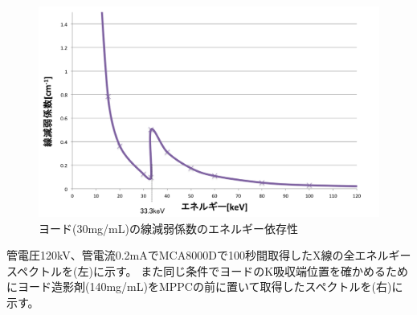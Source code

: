 \begin{figure}[H]
 \begin{center}
 \includegraphics[bb=0.000000 0.000000 641.226992 396.927187,width=0.8\hsize]{image2/chapter5/iodine_atten.png} 
 \end{center}
 \caption{ヨード(30mg/mL)の線減弱係数のエネルギー依存性}
 \label{fig:iodine_atten}
\end{figure}


管電圧120kV、管電流0.2mAでMCA8000Dで100秒間取得したX線の全エネルギースペクトルを(左)に示す。
また同じ条件でヨードのK吸収端位置を確かめるためにヨード造影剤(140mg/mL)をMPPCの前に置いて取得したスペクトルを(右)に示す。

